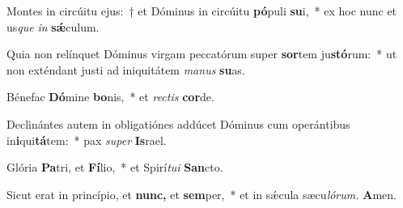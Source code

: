 \item Montes in circúitu ejus:~† et Dóminus in circúitu \textbf{pó}puli \textbf{su}i,~* ex hoc nunc et us\hspace{0.03em}\textit{que} \textit{in} \textbf{sǽ}culum.
\item Quia non relínquet Dóminus virgam peccatórum super \textbf{sor}tem ju\textbf{stó}rum:~* ut non exténdant justi ad iniquitátem \textit{manus} \textbf{su}as.
\item Bénefac \textbf{Dó}mine \textbf{bo}nis,~* et \textit{rectis} \textbf{cor}de.
\item Declinántes autem in obligatiónes addúcet Dóminus cum operántibus in\-\textbf{i}qui\textbf{tá}tem:~* pax \textit{super} \textbf{Is}rael.
\item Glória \textbf{Pa}tri, et \textbf{Fí}lio,~* et Spirí\hspace{0.03em}\textit{tui} \textbf{San}cto.
\item Sicut erat in princípio, et \textbf{nunc,} et \textbf{sem}per,~* et in sǽcula sæcu\textit{lórum.} \textbf{A}men.
